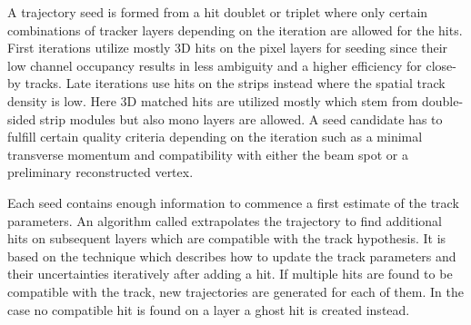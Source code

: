 
A trajectory seed is formed from a hit doublet or triplet where only certain combinations of tracker layers depending on the iteration are allowed for the hits. First iterations utilize mostly 3D hits on the pixel layers for seeding since their low channel occupancy results in less ambiguity and a higher efficiency for close-by tracks. Late iterations use hits on the strips instead where the spatial track density is low. Here 3D matched hits are utilized mostly which stem from double-sided strip modules but also mono layers are allowed. A seed candidate has to fulfill certain quality criteria depending on the iteration such as a minimal transverse momentum and compatibility with either the beam spot or a preliminary reconstructed vertex.

Each seed contains enough information to commence a first estimate of the track parameters. An algorithm called  extrapolates the trajectory to find additional hits on subsequent layers which are compatible with the track hypothesis. It is based on the  technique which describes how to update the track parameters and their uncertainties iteratively after adding a hit. If multiple hits are found to be compatible with the track, new trajectories are generated for each of them. In the case no compatible hit is found on a layer a ghost hit is created instead.

